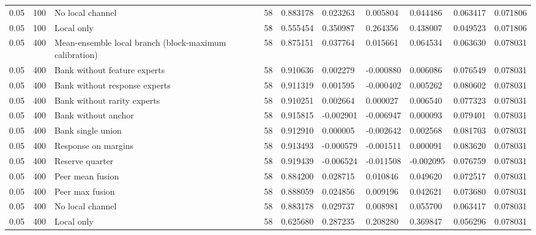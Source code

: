 \begin{tabular}{llllllllll}
0.05 & 100 & No local channel & 58 & 0.883178 & 0.023263 & 0.005804 & 0.044486 & 0.063417 & 0.071806 \\
0.05 & 100 & Local only & 58 & 0.555454 & 0.350987 & 0.264356 & 0.438007 & 0.049523 & 0.071806 \\
0.05 & 400 & Mean-ensemble local branch (block-maximum calibration) & 58 & 0.875151 & 0.037764 & 0.015661 & 0.064534 & 0.063630 & 0.078031 \\
0.05 & 400 & Bank without feature experts & 58 & 0.910636 & 0.002279 & -0.000880 & 0.006086 & 0.076549 & 0.078031 \\
0.05 & 400 & Bank without response experts & 58 & 0.911319 & 0.001595 & -0.000402 & 0.005262 & 0.080602 & 0.078031 \\
0.05 & 400 & Bank without rarity experts & 58 & 0.910251 & 0.002664 & 0.000027 & 0.006540 & 0.077323 & 0.078031 \\
0.05 & 400 & Bank without anchor & 58 & 0.915815 & -0.002901 & -0.006947 & 0.000093 & 0.079401 & 0.078031 \\
0.05 & 400 & Bank single union & 58 & 0.912910 & 0.000005 & -0.002642 & 0.002568 & 0.081703 & 0.078031 \\
0.05 & 400 & Response on margins & 58 & 0.913493 & -0.000579 & -0.001511 & 0.000091 & 0.083620 & 0.078031 \\
0.05 & 400 & Reserve quarter & 58 & 0.919439 & -0.006524 & -0.011508 & -0.002095 & 0.076759 & 0.078031 \\
0.05 & 400 & Peer mean fusion & 58 & 0.884200 & 0.028715 & 0.010846 & 0.049620 & 0.072517 & 0.078031 \\
0.05 & 400 & Peer max fusion & 58 & 0.888059 & 0.024856 & 0.009196 & 0.042621 & 0.073680 & 0.078031 \\
0.05 & 400 & No local channel & 58 & 0.883178 & 0.029737 & 0.008981 & 0.055700 & 0.063417 & 0.078031 \\
0.05 & 400 & Local only & 58 & 0.625680 & 0.287235 & 0.208280 & 0.369847 & 0.056296 & 0.078031 \\
\bottomrule
\end{tabular}
